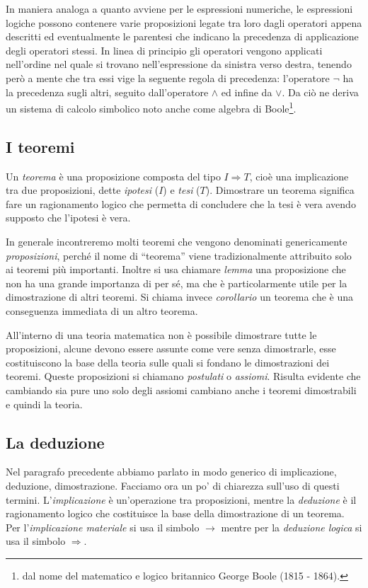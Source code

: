 In maniera analoga a quanto avviene per le espressioni numeriche, le espressioni logiche possono contenere varie proposizioni legate tra loro dagli operatori appena descritti ed eventualmente le parentesi che indicano la precedenza di applicazione degli operatori stessi. In linea di principio gli operatori vengono applicati nell'ordine nel quale si trovano nell'espressione da sinistra verso destra, tenendo però a mente che tra essi vige la seguente regola di precedenza: l'operatore $\neg$ ha la precedenza sugli altri, seguito dall'operatore $\wedge$ ed infine da $\vee$. Da ciò ne deriva un sistema di calcolo simbolico noto anche come algebra di Boole\footnote{dal nome del matematico e logico britannico George Boole (1815 - 1864).}.


\subsection{I teoremi}

Un \emph{teorema} è una proposizione composta del tipo $I\Rightarrow T$, cioè una implicazione tra due proposizioni, dette \emph{ipotesi} ($I$) e \emph{tesi} ($T$). Dimostrare un teorema significa fare un ragionamento logico che permetta di concludere che la tesi è vera avendo supposto che l'ipotesi è vera.

In generale incontreremo molti teoremi che vengono denominati genericamente \emph{proposizioni}, perché il nome di ``teorema'' viene tradizionalmente attribuito solo ai teoremi più importanti. Inoltre si usa chiamare \emph{lemma} una proposizione che non ha una grande importanza di per sé, ma che è particolarmente utile per la dimostrazione di altri teoremi. Si chiama invece \emph{corollario} un teorema che è una conseguenza immediata di un altro teorema.

All'interno di una teoria matematica non è possibile dimostrare tutte le proposizioni, alcune devono essere assunte come vere senza dimostrarle, esse costituiscono la base della teoria sulle quali si fondano le dimostrazioni dei teoremi. Queste proposizioni si chiamano \emph{postulati} o \emph{assiomi}. Risulta evidente che cambiando sia pure uno solo degli assiomi cambiano anche i teoremi dimostrabili e quindi la teoria.


\subsection{La deduzione}

Nel paragrafo precedente abbiamo parlato in modo generico di implicazione, deduzione, dimostrazione. Facciamo ora un po' di chiarezza sull'uso di questi termini. L'\emph{implicazione} è un'operazione tra proposizioni, mentre la \emph{deduzione} è il ragionamento logico che costituisce la base della dimostrazione di un teorema. Per l'\emph{implicazione materiale} si usa il simbolo $\rightarrow$ mentre per la \emph{deduzione logica} si usa il simbolo $\Rightarrow$.

